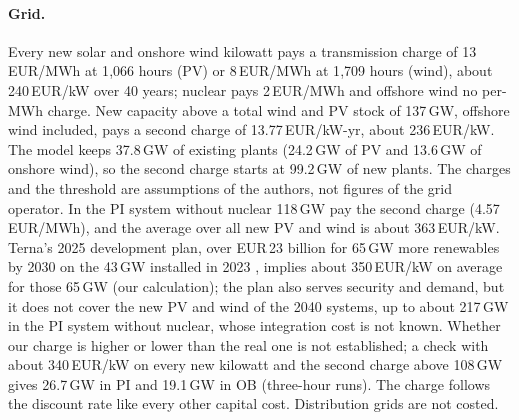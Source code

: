 \paragraph{Grid.} Every new solar and onshore wind kilowatt pays a transmission charge of 13\,EUR/MWh at 1{,}066 hours (PV) or 8\,EUR/MWh at 1{,}709 hours (wind), about 240\,EUR/kW over 40 years; nuclear pays 2\,EUR/MWh and offshore wind no per-MWh charge. New capacity above a total wind and PV stock of 137\,GW, offshore wind included, pays a second charge of 13.77\,EUR/kW-yr, about 236\,EUR/kW. The model keeps 37.8\,GW of existing plants (24.2\,GW of PV and 13.6\,GW of onshore wind), so the second charge starts at 99.2\,GW of new plants. The charges and the threshold are assumptions of the authors, not figures of the grid operator. In the PI system without nuclear 118\,GW pay the second charge (4.57\,EUR/MWh), and the average over all new PV and wind is about 363\,EUR/kW. Terna's 2025 development plan, over EUR\,23 billion for 65\,GW more renewables by 2030 on the 43\,GW installed in 2023 \citep{TernaPdS2025}, implies about 350\,EUR/kW on average for those 65\,GW (our calculation); the plan also serves security and demand, but it does not cover the new PV and wind of the 2040 systems, up to about 217\,GW in the PI system without nuclear, whose integration cost is not known. Whether our charge is higher or lower than the real one is not established; a check with about 340\,EUR/kW on every new kilowatt and the second charge above 108\,GW gives 26.7\,GW in PI and 19.1\,GW in OB (three-hour runs). The charge follows the discount rate like every other capital cost. Distribution grids are not costed.

